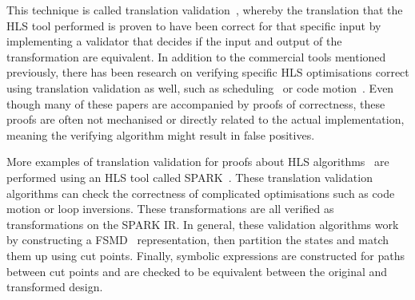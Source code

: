 This technique is called translation validation~\cite{pnueli98_trans}, whereby
the translation that the \gls{HLS} tool performed is proven to have been correct
for that specific input by implementing a validator that decides if the input
and output of the transformation are equivalent.  In addition to the commercial
tools mentioned previously, there has been research on verifying specific
\gls{HLS} optimisations correct using translation validation as well, such as
scheduling~\cite{kim04_autom_fsmd, karfa06_formal_verif_method_sched_high_synth,
  chouksey20_verif_sched_condit_behav_high_level_synth} or code
motion~\cite{banerjee14_verif_code_motion_techn_using_value_propag,
  chouksey19_trans_valid_code_motion_trans_invol_loops}.  Even though many of
these papers are accompanied by proofs of correctness, these proofs are often
not mechanised or directly related to the actual implementation, meaning the
verifying algorithm might result in false positives.

More examples of translation validation for proofs about HLS
algorithms~\cite{karfa06_formal_verif_method_sched_high_synth,
  karfa07_hand_verif_high_synth, kundu07_autom,
  karfa08_equiv_check_method_sched_verif, kundu08_valid_high_level_synth,
  karfa10_verif_datap_contr_gener_phase, karfa12_formal_verif_code_motion_techn,
  chouksey19_trans_valid_code_motion_trans_invol_loops,
  chouksey20_verif_sched_condit_behav_high_level_synth} are performed using an
\gls{HLS} tool called SPARK~\cite{gupta03_spark}.  These translation validation
algorithms can check the correctness of complicated optimisations such as code
motion or loop inversions.  These transformations are all verified as
transformations on the SPARK \gls{IR}.  In general, these validation algorithms
work by constructing a \gls{FSMD}~\cite{hwang99_ffplp} representation, then
partition the states and match them up using cut points.  Finally, symbolic
expressions are constructed for paths between cut points and are checked to be
equivalent between the original and transformed design.


